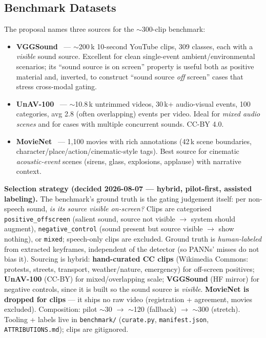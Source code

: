 \documentclass[11pt,a4paper]{article}
\begin{document}
\subsection{Benchmark Datasets}\label{sec:datasets}
The proposal names three sources for the $\sim$300-clip benchmark:
\begin{itemize}
  \item \textbf{VGGSound}~\cite{vggsound} --- $\sim$200\,k 10-second YouTube clips, 309 classes, each
    with a \emph{visible} sound source. Excellent for clean single-event ambient/environmental
    scenarios; its ``sound source is on screen'' property is useful both as positive material and,
    inverted, to construct ``sound source \emph{off} screen'' cases that stress cross-modal gating.
  \item \textbf{UnAV-100}~\cite{unav100} --- $\sim$10.8\,k untrimmed videos, 30\,k+ audio-visual
    events, 100 categories, avg 2.8 (often overlapping) events per video. Ideal for \emph{mixed
    audio scenes} and for cases with multiple concurrent sounds. CC-BY 4.0.
  \item \textbf{MovieNet}~\cite{movienet} --- 1{,}100 movies with rich annotations (42\,k scene
    boundaries, character/place/action/cinematic-style tags). Best source for cinematic
    \emph{acoustic-event} scenes (sirens, glass, explosions, applause) with narrative context.
\end{itemize}
\textbf{Selection strategy (decided 2026-08-07 --- hybrid, pilot-first, assisted labeling).} The
benchmark's ground truth is the gating judgement itself: per non-speech sound, \emph{is its source
visible on-screen?} Clips are categorised \texttt{positive\_offscreen} (salient sound, source not
visible $\to$ system should augment), \texttt{negative\_control} (sound present but source visible
$\to$ show nothing), or \texttt{mixed}; speech-only clips are excluded. Ground truth is
\emph{human-labeled} from extracted keyframes, independent of the detector (so PANNs' misses do not
bias it).
Sourcing is hybrid: \textbf{hand-curated CC clips} (Wikimedia Commons: protests, streets, transport,
weather/nature, emergency) for off-screen positives; \textbf{UnAV-100} (CC-BY) for mixed/overlapping
scale; \textbf{VGGSound} (HF mirror) for negative controls, since it is built so the sound source is
\emph{visible}. \textbf{MovieNet is dropped for clips} --- it ships no raw video (registration +
agreement, movies excluded). Composition: pilot $\sim$30 $\to$ $\sim$120 (fallback) $\to$ $\sim$300
(stretch). Tooling + labels live in \texttt{benchmark/} (\texttt{curate.py}, \texttt{manifest.json},
\texttt{ATTRIBUTIONS.md}); clips are gitignored.
\end{document}
